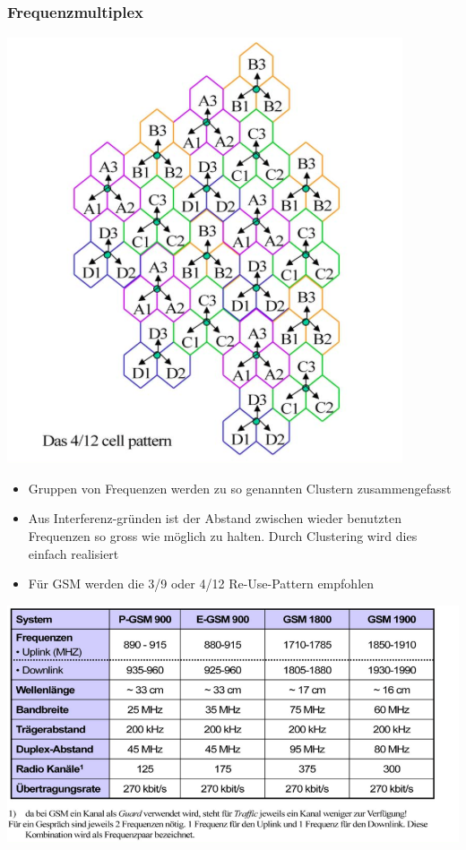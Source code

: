 \subsubsection{Frequenzmultiplex}
\begin{minipage}{0.5 \linewidth}
\includegraphics[width = \linewidth]{./Pics/GSMFrequenzplan}
\end{minipage}
\begin{minipage}{0.5 \linewidth}
\begin{itemize}
\item Gruppen von Frequenzen werden zu so genannten Clustern zusammengefasst
\item Aus Interferenz-gründen ist der Abstand zwischen wieder benutzten Frequenzen so gross wie möglich zu halten. Durch Clustering wird dies einfach realisiert
\item Für GSM werden die 3/9 oder 4/12 Re-Use-Pattern empfohlen
\end{itemize}
\end{minipage}
\includegraphics[width = 0.5 \linewidth]{./Pics/GSMFrequenzkonzept}

